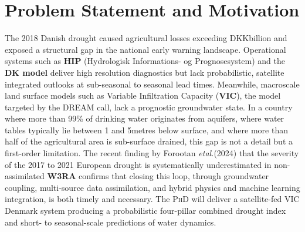 \section{Problem Statement and Motivation}

The 2018 Danish drought caused agricultural losses exceeding DKK\nobreakspace billion and exposed a structural gap in the national early warning landscape. Operational systems such as \textbf{HIP} (Hydrologisk Informations- og Prognosesystem) and the \textbf{DK model} deliver high resolution diagnostics but lack probabilistic, satellite integrated outlooks at sub-seasonal to seasonal lead times. Meanwhile, macroscale land surface models such as Variable Infiltration Capacity (\textbf{VIC}), the model targeted by the \textsc{DREAM} call, lack a prognostic groundwater state. In a country where more than 99\% of drinking water originates from aquifers, where water tables typically lie between 1 and 5\nobreakspace metres below surface, and where more than half of the agricultural area is sub-surface drained, this gap is not a detail but a first-order limitation. The recent finding by Forootan \textit{et\nobreakspace al.}\nobreakspace (2024) that the severity of the 2017 to 2021 European drought is systematically underestimated in non-assimilated \textbf{W3RA} confirms that closing this loop, through groundwater coupling, multi-source data assimilation, and hybrid physics and machine learning integration, is both timely and necessary. The \textsc{PhD} will deliver a satellite-fed VIC Denmark system producing a probabilistic four-pillar combined drought index and short- to seasonal-scale predictions of water dynamics.
